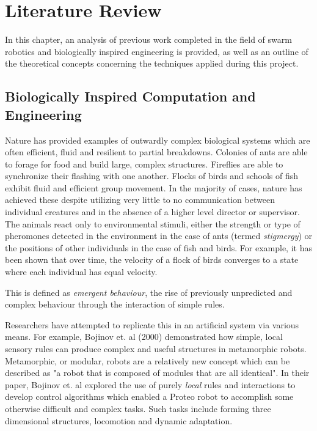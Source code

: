 


\chapter{Literature Review}
\label{chap:LiteratureReview}

In this chapter, an analysis of previous work completed in the field of swarm robotics and biologically inspired engineering is provided, as well as an outline of the theoretical concepts concerning the techniques applied during this project.

\section{Biologically Inspired Computation and Engineering}

Nature has provided examples of outwardly complex biological systems which are often efficient, fluid and resilient to partial breakdowns. Colonies of ants are able to forage for food and build large, complex structures. Fireflies are able to synchronize their flashing with one another. Flocks of birds and schools of fish exhibit fluid and efficient group movement. In the majority of cases, nature has achieved these despite utilizing very little to no communication between individual creatures and in the absence of a higher level director or supervisor. The animals react only to environmental stimuli, either the strength or type of pheromones detected in the environment in the case of ants (termed \textsl{stigmergy}) or the positions of other individuals in the case of fish and birds. For example, it has been shown that over time, the velocity of a flock of birds converges to a state where each individual has equal velocity. \cite{cucker-smale}

This is defined as \textsl{emergent behaviour}, the rise of previously unpredicted and complex behaviour through the interaction of simple rules.

Researchers have attempted to replicate this in an artificial system via various means. For example, Bojinov et. al (2000) demonstrated how simple, local sensory rules can produce complex and useful structures in metamorphic robots. \cite{Bojinov2000} Metamorphic, or modular, robots are a relatively new concept which can be described as "a robot that is composed of modules that are all identical". \cite{Yim} In their paper, Bojinov et. al explored the use of purely \textit{local} rules and interactions to develop control algorithms which enabled a Proteo robot to accomplish some otherwise difficult and complex tasks. Such tasks include forming three dimensional structures, locomotion and dynamic adaptation.

